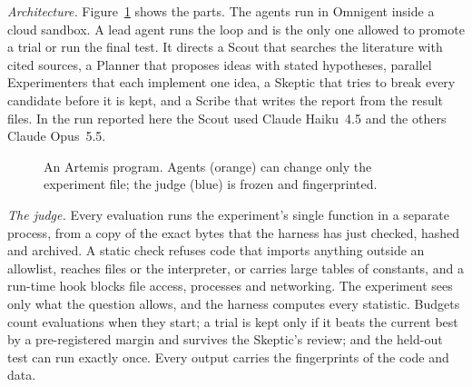 \documentclass[11pt]{amsart}
\numberwithin{equation}{section}
\begin{document}
\emph{Architecture.} Figure~\ref{fig:architecture} shows the parts. The agents run in Omnigent \cite{Omnigent} inside a cloud sandbox. A lead agent runs the loop and is the only one allowed to promote a trial or run the final test. It directs a Scout that searches the literature with cited sources, a Planner that proposes ideas with stated hypotheses, parallel Experimenters that each implement one idea, a Skeptic that tries to break every candidate before it is kept, and a Scribe that writes the report from the result files. In the run reported here the Scout used Claude Haiku~4.5 and the others Claude Opus~5.5.

\begin{figure}[ht]
\centering
{}
\caption{An Artemis program. Agents (orange) can change only the experiment file; the judge (blue) is frozen and fingerprinted.}\label{fig:architecture}
\end{figure}

\emph{The judge.} Every evaluation runs the experiment's single function in a separate process, from a copy of the exact bytes that the harness has just checked, hashed and archived. A static check refuses code that imports anything outside an allowlist, reaches files or the interpreter, or carries large tables of constants, and a run-time hook blocks file access, processes and networking. The experiment sees only what the question allows, and the harness computes every statistic. Budgets count evaluations when they start; a trial is kept only if it beats the current best by a pre-registered margin and survives the Skeptic's review; and the held-out test can run exactly once. Every output carries the fingerprints of the code and data.
\end{document}
